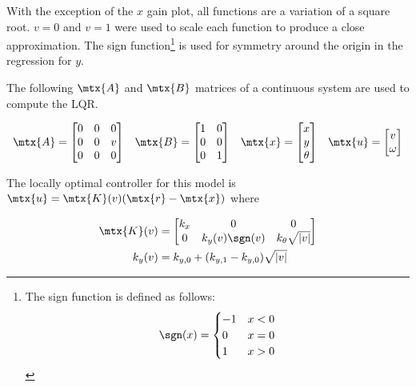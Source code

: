 With the exception of the $x$ gain plot, all functions are a variation of a
square root. $v = 0$ and $v = 1$ were used to scale each function to produce a
close approximation. The sign function\footnote{The sign function is defined as
follows:
\begin{equation*}
  \sgn(x) = \begin{cases}
    -1 & x < 0 \\
    0 & x = 0 \\
    1 & x > 0
  \end{cases}
\end{equation*}} is used for symmetry around the origin in the regression for
$y$.
\begin{theorem}
  \label{thm:linear_time-varying_unicycle_controller}

  The following $\mtx{A}$ and $\mtx{B}$ matrices of a continuous system are used
  to compute the LQR.

  \begin{equation}
    \begin{array}{llll}
      \mtx{A} =
      \begin{bmatrix}
        0 & 0 & 0 \\
        0 & 0 & v \\
        0 & 0 & 0
      \end{bmatrix} &
      \mtx{B} =
      \begin{bmatrix}
        1 & 0 \\
        0 & 0 \\
        0 & 1
      \end{bmatrix} &
      \mtx{x} = \begin{bmatrix}x \\ y \\ \theta\end{bmatrix} &
      \mtx{u} = \begin{bmatrix}v \\ \omega\end{bmatrix}
    \end{array}
  \end{equation}

  The locally optimal controller for this model is
  $\mtx{u} = \mtx{K}(v) (\mtx{r} - \mtx{x})$ where

  \begin{align}
    \mtx{K}(v) &= \begin{bmatrix}
      k_x & 0 & 0 \\
      0 & k_y(v) \sgn(v) & k_{\theta} \sqrt{|v|}
    \end{bmatrix} \\
    k_y(v) &= k_{y, 0} + (k_{y, 1} - k_{y, 0}) \sqrt{|v|}
  \end{align}


\end{theorem}
